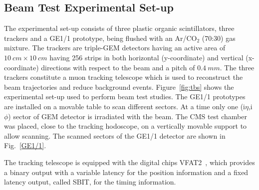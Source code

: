 \subsection{Beam Test Experimental Set-up}
The experimental set-up consists of three plastic organic scintillators, three trackers and a GE1/1 prototype, being flushed with an Ar/CO$_{2}$ (70:30) gas mixture.
The trackers are triple-GEM detectors having an active area of $10~cm\times10~cm$ having 256 strips in both horizontal (y-coordinate) and vertical (x-coordinate) directions with respect to the beam and a pitch of $0.4~mm$.
The three trackers constitute a muon tracking telescope which is used to reconstruct the beam trajectories and reduce background events.
Figure~\ref{fig:tbs} shows the experimental set-up used to perform beam test studies.
The GE1/1 prototypes are installed on a movable table to scan different sectors. At a time only one (i$\eta$,i$\phi$) sector of GEM detector is irradiated with the beam.
The CMS test chamber was placed, close to the tracking hodoscope, on a vertically movable support to allow scanning. The scanned sectors of the GE1/1 detector are shown in Fig.~\ref{GE1/1}.

The tracking telescope is equipped with the digital chips VFAT2~\cite{Aspell:2008zz}, which provides a binary output with a variable latency for the position information and a fixed latency output, called SBIT, for the timing information.


